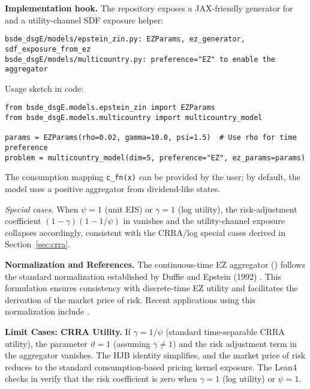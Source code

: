﻿\documentclass[11pt,letterpaper,oneside]{article}
\numberwithin{equation}{section}
\newcommand{\1}{\mathbf{1}}
\begin{document}
\begin{tcolorbox}[didacticstyle]
\textbf{Implementation hook.} The repository exposes a JAX-friendly generator
for  and a utility-channel SDF exposure helper:
\begin{Verbatim}[fontsize=\small]
bsde_dsgE/models/epstein_zin.py: EZParams, ez_generator, sdf_exposure_from_ez
bsde_dsgE/models/multicountry.py: preference="EZ" to enable the aggregator
\end{Verbatim}
Usage sketch in code:
\begin{Verbatim}[fontsize=\small]
from bsde_dsgE.models.epstein_zin import EZParams
from bsde_dsgE.models.multicountry import multicountry_model

params = EZParams(rho=0.02, gamma=10.0, psi=1.5)  # Use rho for time preference
problem = multicountry_model(dim=5, preference="EZ", ez_params=params)
\end{Verbatim}
The consumption mapping \verb|c_fn(x)| can be provided by the user; by default,
the model uses a positive aggregator from dividend-like states.
\end{tcolorbox}

\noindent\emph{Special cases.} When $\psi=1$ (unit EIS) or $\gamma=1$ (log utility), the risk-adjustment coefficient $(1-\gamma)(1-1/\psi)$ in  vanishes and the utility-channel exposure collapses accordingly, consistent with the CRRA/log special cases derived in Section~\ref{sec:crra}.

\begin{tcolorbox}[literaturestyle]
\textbf{Normalization and References.}
The continuous-time EZ aggregator () follows the standard normalization established by Duffie and Epstein (1992) \cite{duffie_epstein_1992}. This formulation ensures consistency with discrete-time EZ utility and facilitates the derivation of the market price of risk. Recent applications using this normalization include \cite{Sauzet2023}.
\end{tcolorbox}

\begin{tcolorbox}[mathstyle]
\textbf{Limit Cases: CRRA Utility.}
If $\gamma = 1/\psi$ (standard time-separable CRRA utility), the parameter $\vartheta=1$ (assuming $\gamma\neq 1$) and the risk adjustment term in the aggregator vanishes. The HJB identity simplifies, and the market price of risk reduces to the standard consumption-based pricing kernel exposure. The Lean4 checks in  verify that the risk coefficient is zero when $\gamma=1$ (log utility) or $\psi=1$.
\end{tcolorbox}
\end{document}
